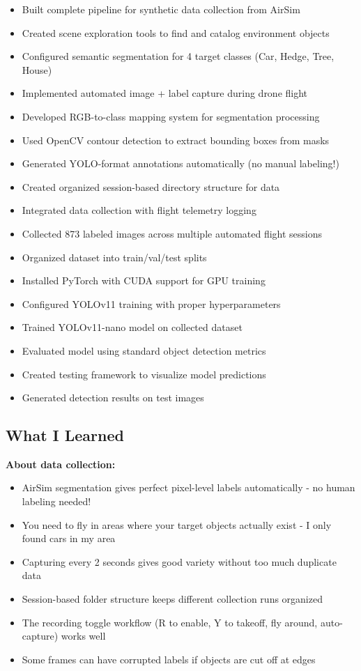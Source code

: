 \begin{itemize}
	\item Built complete pipeline for synthetic data collection from AirSim
	\item Created scene exploration tools to find and catalog environment objects
	\item Configured semantic segmentation for 4 target classes (Car, Hedge, Tree, House)
	\item Implemented automated image + label capture during drone flight
	\item Developed RGB-to-class mapping system for segmentation processing
	\item Used OpenCV contour detection to extract bounding boxes from masks
	\item Generated YOLO-format annotations automatically (no manual labeling!)
	\item Created organized session-based directory structure for data
	\item Integrated data collection with flight telemetry logging
	\item Collected 873 labeled images across multiple automated flight sessions
	\item Organized dataset into train/val/test splits
	\item Installed PyTorch with CUDA support for GPU training
	\item Configured YOLOv11 training with proper hyperparameters
	\item Trained YOLOv11-nano model on collected dataset
	\item Evaluated model using standard object detection metrics
	\item Created testing framework to visualize model predictions
	\item Generated detection results on test images
\end{itemize}

\subsection{What I Learned}

\textbf{About data collection:}
\begin{itemize}
	\item AirSim segmentation gives perfect pixel-level labels automatically - no human labeling needed!
	\item You need to fly in areas where your target objects actually exist - I only found cars in my area
	\item Capturing every 2 seconds gives good variety without too much duplicate data
	\item Session-based folder structure keeps different collection runs organized
	\item The recording toggle workflow (R to enable, Y to takeoff, fly around, auto-capture) works well
	\item Some frames can have corrupted labels if objects are cut off at edges
\end{itemize}

